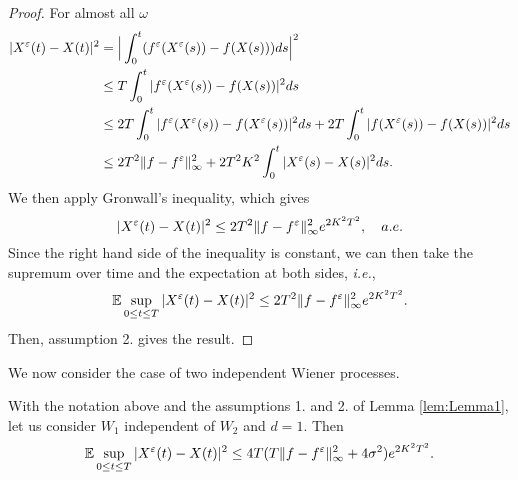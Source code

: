 \begin{proof}
For almost all $\omega$
\begin{equation*}
\begin{aligned}
	|X^\varepsilon(t) - X(t)|^2  &= \Big|\int_0^t (f^\varepsilon (X^\varepsilon(s)) - f(X(s)))ds \Big|^2 \\
	&\leq T \int_0^t |f^\varepsilon (X^\varepsilon(s)) - f(X(s))|^2 ds  \\
	&\leq 2T \int_0^t |f^\varepsilon (X^\varepsilon(s)) - f(X^\varepsilon(s))|^2 ds + 2T \int_0^t |f (X^\varepsilon(s)) - f(X(s))|^2 ds \\
	&\leq 2T^2 \|f - f^\varepsilon\|_{\infty}^2 + 2T^2K^2 \int_0^t |X^\varepsilon(s) - X(s)|^2ds.
\end{aligned} 
\end{equation*}
We then apply Gronwall's inequality, which gives 
\begin{equation}\label{eq:TheoryEpsilon}
	|X^\varepsilon(t) - X(t)|^2 \leq  2T^2 \|f - f^\varepsilon\|_{\infty}^2 e^{2K^2T^2}, \quad a.e.
\end{equation}
Since the right hand side of the inequality is constant, we can then take the supremum over time and the expectation at both sides, \textit{i.e.},
\begin{equation*}
	\mathbb{E} \sup_{0 \leq t \leq T} |X^\varepsilon(t) - X(t)|^2 \leq  2T^2 \|f - f^\varepsilon\|_{\infty}^2 e^{2K^2T^2}.
\end{equation*}
Then, assumption 2. gives the result.
\end{proof}
\noindent We now consider the case of two independent Wiener processes.

\begin{lemma}\label{lem:Lemma2} With the notation above and the assumptions 1. and 2. of Lemma \ref{lem:Lemma1}, let us consider $W_1$ independent of $W_2$ and $d = 1$. Then
\begin{equation*}	
	\mathbb{E} \sup_{0 \leq t \leq T} |X^\varepsilon(t) - X(t)|^2 \leq 4T(T \|f - f^\varepsilon\|_{\infty}^2 + 4\sigma^2) e^{2K^2T^2}.
\end{equation*}
\end{lemma}

